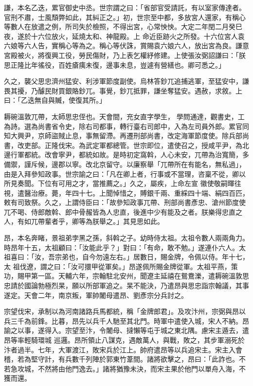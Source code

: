 \begin{pinyinscope}
 謙，本名乙迭，累官御史中丞。世宗謂之曰：「省部官受請託，有以室家傳達者。官刑不肅，士風頹弊如此，其糾正之。」初，世宗至中都，多放宮人還家，有稱心等數人在放遣之例，所司失於檢照，不得出宮，心常怏怏。大定二年閏二月癸巳夜，遂於十六位放火，延燒太和、神龍殿。上
 命近臣跡火之所發。十六位宮人袁六娘等六人告，實稱心等為之。稱心等伏誅，賞賜袁六娘六人，放出宮為良。謙意宮殿被火，將復興工役，勞民傷財，乃上表乞權紓修建。上使張汝弼詔謙曰：「朕思正隆比年徭役，百姓瘡痍未復，邊事未息，豈遽有營繕也。卿可悉之。」



 久之，襲父思忠濟州猛安、利涉軍節度副使。烏林答鈔兀追捕逃軍，至猛安中，謙畏其擾，乃醵民財買銀賂鈔兀。事覺，鈔兀抵罪，謙坐奪猛安。遇赦，求敘。上曰：「乙迭無自與贓，使復其所。」



 耨碗溫敦兀帶，太師思忠侄也。天會間，充女直字學生，
 學問通達，觀書史，工為詩。選為尚書省令史，除右司都事，轉行臺右司郎中，入為左司員外郎。累官同知大興尹，京師盜賊止息，事無留滯。再遷刑部尚書，改定海軍節度使。除兵部尚書，改吏部。正隆伐宋。為武定軍都總管。世宗即位，遣使召之，授咸平尹，為北邊行軍都統。改會寧尹，都統如故。是時初定窩斡，人心未安，兀帶為治寬簡，多備禦，謹斥候，邊郡以寧。改北京留守。以廉察舉「兀帶所在有能名，無私過」，由是入拜參知政事。世宗諭之曰：「凡在卿上者，行事或不當理，咨稟不從，卿以所見奏聞。下位有可用之才，當推薦之。」久之，屬疾，上命左宣
 徽使敬嗣暉往視，遣醫治療。薨，年四十七。上聞悼惜之，賻銀千兩、重綵四十端、絹四百匹，敕有司致祭。久之，上謂侍臣曰：「故參知政事兀帶、刑部尚書彥忠、滄州節度使兀不喝、侍郎敵斡、郎中骨赧皆為人忠直，後進中少有能及之者。朕樂得忠直之人，有如兀帶輩者乎，卿等為朕舉之。」其見思如此。



 昂，本名奔睹，景祖弟孛黑之孫，斜斡之子。幼時侍太祖。太祖令數人兩兩角力。時昂年十五，太祖顧曰：「汝能此乎？」對曰：「有命，敢不勉。」遂連仆六人。太祖喜曰：「汝，吾宗弟也，自今勿遠左右。」居數日，賜金牌，令佩以侍。年十七，太
 祖伐遼，謂之曰：「汝可擐甲從軍矣。」昂遂佩所賜金牌從軍。太祖平燕，策功，賜甲第一區。天輔六年，宗翰駐北安州，聞遼主延禧在鴛鴦濼，遣耨碗溫敦思忠請於國論勃極烈杲，願以所部軍追之。杲不能決，乃遣昂與思忠詣宗翰議，其事遂定。天會二年，南京叛，軍帥闍母遣昂、劉彥宗分兵討之。



 宗望伐宋，承制以為河南諸路兵馬都統，稱「金牌郎君」。及攻汴州，宗弼與昂以兵三千為前鋒。比暮，昂先以兵千人馳至其北門。時軍中遣使入城，宋人不納。昂諭之以事，遂得入。宗望至汴，令闍母、撻懶等屯于城之東北隅。慮宋主遁去，遣昂等率輕騎環城
 巡邏。昂所領止八謀克，遇敵萬人，與戰，敗之，其步軍溺死於汴者過半。七年，大軍渡江，敗宋兵於江上。帥府遣昂等以兵追宋主。宋主入會稽，若為堅守計，有兵數千列陣於郭東竹葦間。諸將欲擊之，昂曰：「此詐也。不若急攻城，不然將由他門逸去。」諸將猶豫未決，而宋主果於他門以單舟入海，不獲而還。




\end{pinyinscope}

